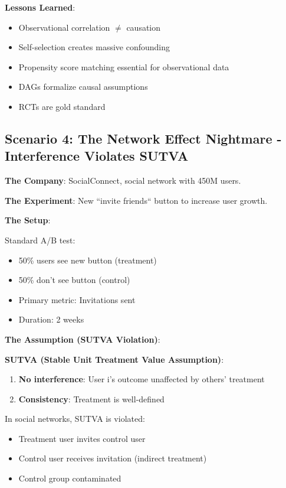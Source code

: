 \textbf{Lessons Learned}:
\begin{itemize}
    \item Observational correlation $\neq$ causation
    \item Self-selection creates massive confounding
    \item Propensity score matching essential for observational data
    \item DAGs formalize causal assumptions
    \item RCTs are gold standard
\end{itemize}

\subsection{Scenario 4: The Network Effect Nightmare - Interference Violates SUTVA}

\textbf{The Company}: SocialConnect, social network with 450M users.

\textbf{The Experiment}: New ``invite friends`` button to increase user growth.

\textbf{The Setup}:

Standard A/B test:
\begin{itemize}
    \item 50\% users see new button (treatment)
    \item 50\% don't see button (control)
    \item Primary metric: Invitations sent
    \item Duration: 2 weeks
\end{itemize}

\textbf{The Assumption (SUTVA Violation)}:

\textbf{SUTVA (Stable Unit Treatment Value Assumption)}:
\begin{enumerate}
    \item \textbf{No interference}: User i's outcome unaffected by others' treatment
    \item \textbf{Consistency}: Treatment is well-defined
\end{enumerate}

In social networks, SUTVA is violated:
\begin{itemize}
    \item Treatment user invites control user
    \item Control user receives invitation (indirect treatment)
    \item Control group contaminated
\end{itemize}

